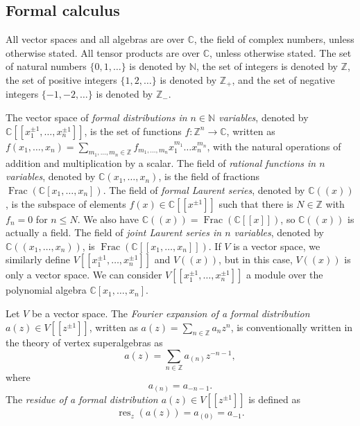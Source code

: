 \documentclass[a4paper, 12pt, reqno]{amsart}
\theoremstyle{remark}
\DeclareMathOperator{\Frac}{Frac}
\DeclareMathOperator{\res}{res}
\begin{document}
\subsection{Formal calculus}
\label{sec:formal-calculus}

All vector spaces and all algebras are over $\mathbb{C}$, the field of complex numbers, unless otherwise stated.
All tensor products are over $\mathbb{C}$, unless otherwise stated.
The set of natural numbers $\{0, 1, \dots\}$ is denoted by $\mathbb{N}$, the set of integers is denoted by $\mathbb{Z}$, the set of positive integers $\{1, 2, \dots\}$ is denoted by $\mathbb{Z}_+$, and the set of negative integers $\{-1, -2, \dots\}$ is denoted by $\mathbb{Z}_-$.

The vector space of \emph{formal distributions in $n \in \mathbb{N}$ variables}, denoted by $\mathbb{C}[[x_1^{\pm1}, \dots, x_n^{\pm1}]]$, is the set of functions $f: \mathbb{Z}^n \to \mathbb{C}$, written as $f(x_1, \dots, x_n) = \sum_{m_1, \dots, m_n \in \mathbb{Z}}f_{m_1, \dots, m_n}x_1^{m_1}\dots x_n^{m_n}$, with the natural operations of addition and multiplication by a scalar.
The field of \emph{rational functions in $n$ variables}, denoted by $\mathbb{C}(x_1, \dots, x_n)$, is the field of fractions $\Frac(\mathbb{C}[x_1, \dots, x_n])$.
The field of \emph{formal Laurent series}, denoted by $\mathbb{C}((x))$, is the subspace of elements $f(x) \in \mathbb{C}[[x^{\pm1}]]$ such that there is $N \in \mathbb{Z}$ with $f_n = 0$ for $n \le N$.
We also have $\mathbb{C}((x)) = \Frac(\mathbb{C}[[x]])$, so $\mathbb{C}((x))$ is actually a field.
The field of \emph{joint Laurent series in $n$ variables}, denoted by $\mathbb{C}((x_1, \dots, x_n))$, is $\Frac(\mathbb{C}[[x_1, \dots, x_n]])$.
If $V$ is a vector space, we similarly define $V[[x_1^{\pm1}, \dots, x_n^{\pm1}]]$ and $V((x))$, but in this case, $V((x))$ is only a vector space.
We can consider $V[[x_1^{\pm1}, \dots, x_n^{\pm1}]]$ a module over the polynomial algebra $\mathbb{C}[x_1, \dots, x_n]$.

Let $V$ be a vector space.
The \emph{Fourier expansion of a formal distribution $a(z) \in V[[z^{\pm1}]]$}, written as $a(z) = \sum_{n \in \mathbb{Z}}a_nz^n$, is conventionally written in the theory of vertex superalgebras as
\begin{equation*}
  a(z) = \sum_{n \in \mathbb{Z}}a_{(n)}z^{-n - 1},
\end{equation*}
where
\begin{equation*}
  a_{(n)} = a_{-n - 1}.
\end{equation*}
The \emph{residue of a formal distribution $a(z) \in V[[z^{\pm1}]]$} is defined as
\begin{equation*}
  \res_z(a(z)) = a_{(0)} = a_{-1}.
\end{equation*}
\end{document}
